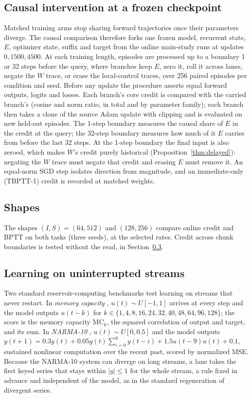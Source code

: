 \documentclass[11pt]{article}
\theoremstyle{definition}
\begin{document}
\subsection{Causal intervention at a frozen checkpoint}

Matched training arms stop sharing forward trajectories once their parameters
diverge. The causal comparison therefore forks one frozen model, recurrent state,
$E$, optimizer state, suffix and target from the online main-study runs at updates
$0,1500,4500$. At each training length, episodes are processed up to a boundary 1 or
32 steps before the query, where branches keep $E$, zero it, roll it across lanes,
negate the $W$ trace, or erase the local-control traces, over 256 paired episodes
per condition and seed. Before any update the procedure asserts equal forward
outputs, logits and losses. Each branch's core credit is compared with the carried
branch's (cosine and norm ratio, in total and by parameter family); each branch then
takes a clone of the source Adam update with clipping and is evaluated on new
held-out episodes. The 1-step boundary measures the causal share of $E$ in the
credit at the query; the 32-step boundary measures how much of it $E$ carries from
before the last 32 steps. At the 1-step boundary the final input is also zeroed, which
makes $W$'s credit purely historical (Proposition~\ref{thm:delayed}): negating the
$W$ trace must negate that credit and erasing $E$ must remove it. An equal-norm SGD
step isolates direction from magnitude, and an immediate-only (TBPTT-1) credit is
recorded at matched weights.

\subsection{Shapes}

The shapes $(I,S)=(64,512)$ and $(128,256)$ compare online credit and BPTT on both
tasks (three seeds), at the selected rates. Credit across chunk boundaries is tested
without the read, in Section~\ref{sec:sustained}.

\subsection{Learning on uninterrupted streams}
\label{sec:sustained}

Two standard reservoir-computing benchmarks test learning on streams that never
restart. In \emph{memory capacity} \citep{jaeger2001shortterm}, $u(t)\sim U[-1,1]$
arrives at every step and the model outputs $u(t-k)$ for
$k\in\{1,4,8,16,24,32,40,48,64,96,128\}$; the score is the memory capacity
$\mathrm{MC}_k$, the squared correlation of output and target, and its sum. In
\emph{NARMA-10} \citep{atiya2000narma}, $u(t)\sim U[0,0.5]$ and the model outputs
$y(t+1)=0.3y(t)+0.05y(t)\sum_{i=0}^{9}y(t-i)+1.5u(t-9)u(t)+0.1$, sustained nonlinear
computation over the recent past, scored by normalized MSE. Because the NARMA-10
system can diverge on long streams, a lane takes the first keyed series that stays
within $|y|\le1$ for the whole stream, a rule fixed in advance and independent of
the model, as in the standard regeneration of divergent series.
\end{document}

